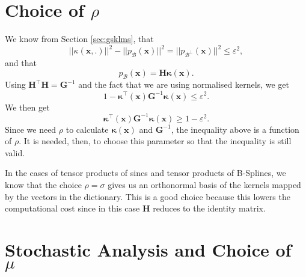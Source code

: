 \section{Choice of $\rho$}

We know from Section \ref{sec:gsklms}, that 
\begin{equation}
    ||\kappa(\mathbf{x},.)||^2 - ||p_{\mathcal{B}}(\mathbf{x})||^2 = ||p_{\mathcal{B}^\perp}(\mathbf{x})||^2 \leq \varepsilon^2,
\end{equation}
and that
\begin{equation}
    p_{\mathcal{B}}(\mathbf{x}) = \mathbf{H}\boldsymbol{\kappa}(\mathbf{x}).
\end{equation}
Using $\mathbf{H}^{\top}\mathbf{H} = \mathbf{G}^{-1}$ and the fact that we are using normalised kernels, we get
\begin{equation}
    1 - \boldsymbol{\kappa}^{\top}(\mathbf{x})\mathbf{G}^{-1}\boldsymbol{\kappa}(\mathbf{x}) \leq \varepsilon^2.
\end{equation}
We then get 
\begin{equation}
    \boldsymbol{\kappa}^{\top}(\mathbf{x})\mathbf{G}^{-1}\boldsymbol{\kappa}(\mathbf{x}) \geq 1 - \varepsilon^2.
\end{equation}
Since we need $\rho$ to calculate $\boldsymbol{\kappa}(\mathbf{x})$ and $\mathbf{G}^{-1}$, the inequality above is a function of $\rho$. It is needed, then, to choose
this parameter so that the inequality is still valid.


In the cases of tensor products of sincs and tensor products of B-Splines, we know that the choice $\rho = \sigma$ gives us an orthonormal basis of the kernels mapped by the vectors in the dictionary. This is a good choice because this lowers the computational cost since in this case $\mathbf{H}$ reduces to the identity matrix.

\section{Stochastic Analysis and Choice of $\mu$}\label{sec:stochastic}

